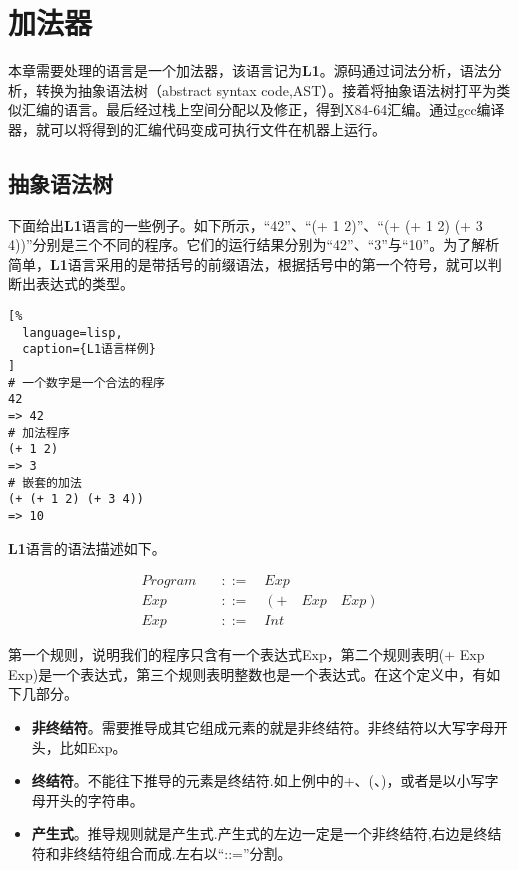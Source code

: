 \chapter{加法器}

本章需要处理的语言是一个加法器，该语言记为\textbf{L1}。源码通过词法分析，语法分析，转换为抽象语法树（abstract syntax code,AST）。接着将抽象语法树打平为类似汇编的语言。最后经过栈上空间分配以及修正，得到X84-64汇编。通过gcc编译器，就可以将得到的汇编代码变成可执行文件在机器上运行。

\section{抽象语法树}

下面给出\textbf{L1}语言的一些例子。如下所示，“42”、“(+ 1 2)”、“(+ (+ 1 2) (+ 3 4))”分别是三个不同的程序。它们的运行结果分别为“42”、“3”与“10”。为了解析简单，\textbf{L1}语言采用的是带括号的前缀语法，根据括号中的第一个符号，就可以判断出表达式的类型。

\begin{lstlisting}[%
  language=lisp,
  caption={L1语言样例}
]
# 一个数字是一个合法的程序
42
=> 42
# 加法程序
(+ 1 2)
=> 3
# 嵌套的加法
(+ (+ 1 2) (+ 3 4))
=> 10
\end{lstlisting}


\textbf{L1}语言的语法描述如下。

\begin{equation}
\begin{aligned}
  \label{eq:1}
   Program \quad &::= \quad Exp \\
   Exp \quad &::= \quad (+ \quad Exp \quad Exp) \\
   Exp \quad &::=  \quad Int
\end{aligned}
\end{equation}

第一个规则，说明我们的程序只含有一个表达式Exp，第二个规则表明(+ Exp Exp)是一个表达式，第三个规则表明整数也是一个表达式。在这个定义中，有如下几部分。

\begin{itemize}
  \item \textbf{非终结符}。需要推导成其它组成元素的就是非终结符。非终结符以大写字母开头，比如Exp。
  \item \textbf{终结符}。不能往下推导的元素是终结符.如上例中的+、(、)，或者是以小写字母开头的字符串。
  \item \textbf{产生式}。推导规则就是产生式.产生式的左边一定是一个非终结符,右边是终结符和非终结符组合而成.左右以“::=”分割。
\end{itemize}

